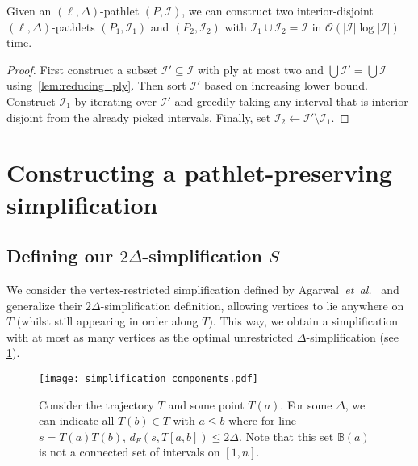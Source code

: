 \documentclass[a4paper,UKenglish,cleveref,thm-restate,notab]{lipics-v2021}
\makeatletter
\newcommand{\etal}{\textit{et~al.\@}\xspace}
\newcommand{\dF}{\ensuremath{d_F}}
\newcommand{\bigO}{\mathcal{O}}
\newcommand{\B}{\mathbb{B}}
\newcommand{\I}{\mathcal{I}}
\makeatother
\begin{document}
    \begin{lemma}
    \label{lem:constructing_interior-disjoint}
        Given an $(\ell, \Delta)$-pathlet $(P, \I)$, we can construct two interior-disjoint $(\ell, \Delta)$-pathlets $(P_1, \I_1)$ and $(P_2, \I_2)$ with $\I_1 \cup \I_2 = \I$ in $\bigO(|\I| \log |\I|)$ time.
    \end{lemma}
    \begin{proof}
        First construct a subset $\I' \subseteq \I$ with ply at most two and $\bigcup \I' = \bigcup \I$ using~\cref{lem:reducing_ply}.
        Then sort $\I'$ based on increasing lower bound.
        Construct $\I_1$ by iterating over $\I'$ and greedily taking any interval that is interior-disjoint from the already picked intervals.
        Finally, set $\I_2 \gets \I' \setminus \I_1$.
    \end{proof}


\section{Constructing a pathlet-preserving simplification}
\label{app:constructing_pathlet_preserving_simplification}

\subsection{Defining our \texorpdfstring{$2\Delta$}{2Δ}-simplification \texorpdfstring{$S$}{S}}
\label{appsub:greedy_simplification}
        
    We consider the vertex-restricted simplification defined by Agarwal~\etal~\cite{agarwal_near-linear_2005} and generalize their $2\Delta$-simplification definition, allowing vertices to lie anywhere on $T$ (whilst still appearing in order along $T$).
    This way, we obtain a simplification with at most as many vertices as the optimal unrestricted $\Delta$-simplification (see \cref{fig:simplification_components}).
        
    \begin{figure}
        \centering
        \texttt{[image: simplification\_components.pdf]}
        \caption{Consider the trajectory $T$ and some point $T(a)$. For some $\Delta$, we can indicate all $T(b) \in T$ with $a \leq b$ where for line $s = \overline{T(a)T(b)}$, $\dF(s, T[a, b]) \leq 2 \Delta$. Note that this set $\B(a)$ is not a connected set of intervals on $[1, n]$.}
        \label{fig:simplification_components}
    \end{figure}
        
\end{document}
